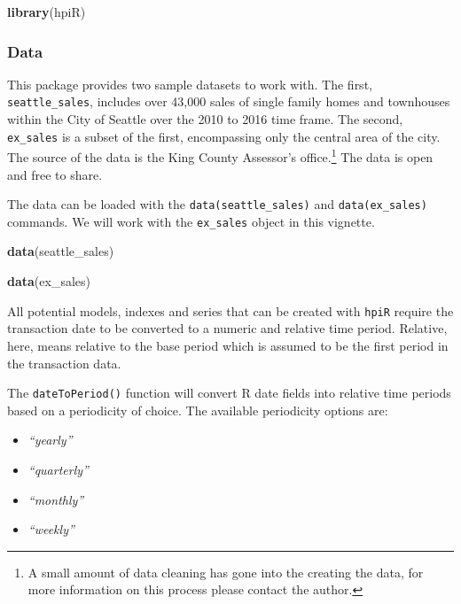 \documentclass[]{article}
\newenvironment{Shaded}{\begin{snugshade}}{\end{snugshade}}
\newcommand{\KeywordTok}[1]{\textcolor[rgb]{0.13,0.29,0.53}{\textbf{#1}}}
\newcommand{\NormalTok}[1]{#1}
\providecommand{\tightlist}{%
  \setlength{\itemsep}{0pt}\setlength{\parskip}{0pt}}
\let\rmarkdownfootnote\footnote%
\def\footnote{\protect\rmarkdownfootnote}
\begin{document}
\begin{Shaded}
\begin{Highlighting}[]
  \KeywordTok{library}\NormalTok{(hpiR)}
\end{Highlighting}
\end{Shaded}

\subsubsection{Data}\label{data}

This package provides two sample datasets to work with. The first,
\texttt{seattle\_sales}, includes over 43,000 sales of single family
homes and townhouses within the City of Seattle over the 2010 to 2016
time frame. The second, \texttt{ex\_sales} is a subset of the first,
encompassing only the central area of the city. The source of the data
is the King County Assessor's office.\footnote{A small amount of data
  cleaning has gone into the creating the data, for more information on
  this process please contact the author.} The data is open and free to
share.

The data can be loaded with the \texttt{data(seattle\_sales)} and
\texttt{data(ex\_sales)} commands. We will work with the
\texttt{ex\_sales} object in this vignette.

\begin{Shaded}
\begin{Highlighting}[]
  \KeywordTok{data}\NormalTok{(seattle_sales)}

  \KeywordTok{data}\NormalTok{(ex_sales)}
\end{Highlighting}
\end{Shaded}

All potential models, indexes and series that can be created with
\texttt{hpiR} require the transaction date to be converted to a numeric
and relative time period. Relative, here, means relative to the base
period which is assumed to be the first period in the transaction data.

The \texttt{dateToPeriod()} function will convert R date fields into
relative time periods based on a periodicity of choice. The available
periodicity options are:

\begin{itemize}
\tightlist
\item
  \emph{``yearly''}
\item
  \emph{``quarterly''}
\item
  \emph{``monthly''}
\item
  \emph{``weekly''}
\end{itemize}
\end{document}

